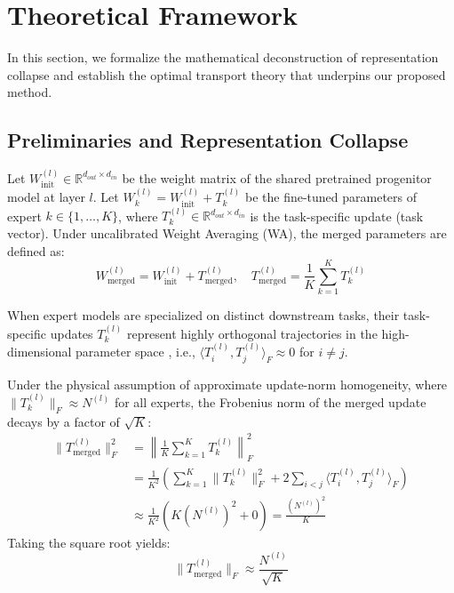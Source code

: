 \documentclass{article}
\theoremstyle{plain}
\theoremstyle{definition}
\theoremstyle{remark}
\begin{document}
\section{Theoretical Framework}
\label{sec:theory}

In this section, we formalize the mathematical deconstruction of representation collapse and establish the optimal transport theory that underpins our proposed method.

\subsection{Preliminaries and Representation Collapse}
Let $W^{(l)}_{\text{init}} \in \mathbb{R}^{d_{out} \times d_{in}}$ be the weight matrix of the shared pretrained progenitor model at layer $l$. Let $W^{(l)}_k = W^{(l)}_{\text{init}} + T^{(l)}_k$ be the fine-tuned parameters of expert $k \in \{1, \dots, K\}$, where $T^{(l)}_k \in \mathbb{R}^{d_{out} \times d_{in}}$ is the task-specific update (task vector). Under uncalibrated Weight Averaging (WA), the merged parameters are defined as:
\begin{equation}
  W^{(l)}_{\text{merged}} = W^{(l)}_{\text{init}} + T^{(l)}_{\text{merged}}, \quad T^{(l)}_{\text{merged}} = \frac{1}{K} \sum_{k=1}^K T^{(l)}_k
\end{equation}

When expert models are specialized on distinct downstream tasks, their task-specific updates $T^{(l)}_k$ represent highly orthogonal trajectories in the high-dimensional parameter space \citep{wortsman2022model, visionary2026holographic}, i.e., $\langle T^{(l)}_i, T^{(l)}_j \rangle_F \approx 0$ for $i \neq j$. 

Under the physical assumption of approximate update-norm homogeneity, where $\|T^{(l)}_k\|_F \approx N^{(l)}$ for all experts, the Frobenius norm of the merged update decays by a factor of $\sqrt{K}$:
\begin{align}
  \|T^{(l)}_{\text{merged}}\|_F^2 &= \left\| \frac{1}{K} \sum_{k=1}^K T^{(l)}_k \right\|_F^2 \nonumber \\
  &= \frac{1}{K^2} \left( \sum_{k=1}^K \|T^{(l)}_k\|_F^2 + 2\sum_{i<j} \langle T^{(l)}_i, T^{(l)}_j \rangle_F \right) \nonumber \\
  &\approx \frac{1}{K^2} \left( K(N^{(l)})^2 + 0 \right) = \frac{(N^{(l)})^2}{K}
\end{align}
Taking the square root yields:
\begin{equation}
  \|T^{(l)}_{\text{merged}}\|_F \approx \frac{N^{(l)}}{\sqrt{K}}
\end{equation}
\end{document}
